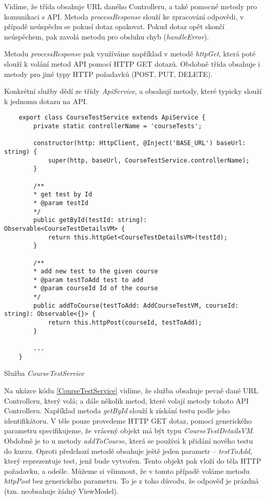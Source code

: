 Vidíme, že třída obsahuje URL daného Controlleru, a také pomocné metody pro komunikaci s API. Metoda \textit{processResponse} slouží ke zpracování odpovědi, v případě neúspěchu se pokusí dotaz opakovat. Pokud dotaz opět skončí neúspěchem, pak zavolá metodu pro obsluhu chyb (\textit{handleError}).

Metodu \textit{processResponse} pak využíváme například v metodě \textit{httpGet}, která poté slouží k volání metod API pomocí HTTP GET dotazů. Obdobně třída obsahuje i metody pro jiné typy HTTP požadavků (POST, PUT, DELETE).

Konkrétní služby dědí ze třídy \textit{ApiService}, a obsahují metody, které typicky slouží k jednomu dotazu na API.

\begin{program}
	\begin{lstlisting}
	export class CourseTestService extends ApiService {
		private static controllerName = 'courseTests';
		
		constructor(http: HttpClient, @Inject('BASE_URL') baseUrl: string) {
			super(http, baseUrl, CourseTestService.controllerName);
		}
		
		/**
		* get test by Id
		* @param testId
		*/
		public getById(testId: string): Observable<CourseTestDetailsVM> {
			return this.httpGet<CourseTestDetailsVM>(testId);
		}
		
		/**
		* add new test to the given course
		* @param testToAdd test to add
		* @param courseId Id of the course
		*/
		public addToCourse(testToAdd: AddCourseTestVM, courseId: string): Observable<{}> {
			return this.httpPost(courseId, testToAdd);
		}
		
		...
	}
	\end{lstlisting}
	\caption{Služba \textit{CourseTestService}}
	\label{CourseTestService}
\end{program}

Na ukázce kódu \ref{CourseTestService} vidíme, že služba obsahuje pevně dané URL Controlleru, který volá; a dále několik metod, které volají metody tohoto API Controlleru.
Například metoda \textit{getById} slouží k získání testu podle jeho identifikátoru. V těle pouze provedeme HTTP GET dotaz, pomocí generického parametru specifikujeme, že vrácený objekt má být typu \textit{CourseTestDetailsVM}. 
Obdobně je to u metody \textit{addToCourse}, která se používá k přidání nového testu do kurzu. Oproti předchozí metodě obsahuje ještě jeden parametr -- \textit{testToAdd}, který reprezentuje test, jenž bude vytvořen. Tento objekt pak vloží do těla HTTP požadavku, a odešle. 
Můžeme si všimnout, že v tomto případě voláme metodu \textit{httpPost} bez generického parametru. To je z toho důvodu, že odpověď je prázdná (tzn. neobsahuje žádný ViewModel).


